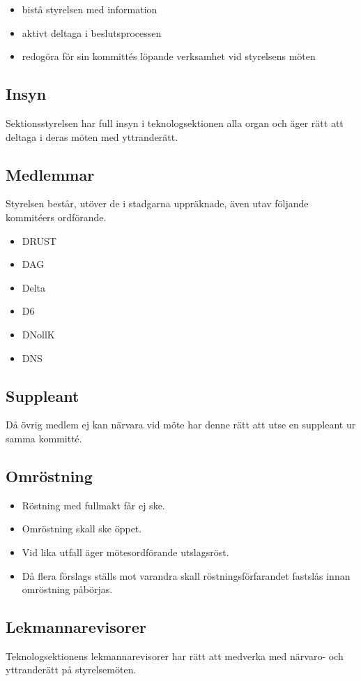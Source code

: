 \begin{itemize}
  \item bistå styrelsen med information 
  \item aktivt deltaga i beslutsprocessen 
  \item redogöra för sin kommittés löpande verksamhet vid styrelsens möten 
\end{itemize}

\subsection{Insyn} 

Sektionsstyrelsen har full insyn i teknologsektionen alla organ och äger rätt att deltaga i deras möten med yttranderätt. 

\subsection{Medlemmar} 
Styrelsen består, utöver de i stadgarna uppräknade, även utav följande kommitéers ordförande. 
\begin{itemize}
  \item DRUST 
  \item DAG 
  \item Delta 
  \item D6 
  \item DNollK
  \item DNS
\end{itemize}

\subsection{Suppleant} 

Då övrig medlem ej kan närvara vid möte har denne rätt att utse en suppleant ur samma kommitté. 
\subsection{Omröstning} 

\begin{itemize}
  \item Röstning med fullmakt får ej ske. 
  \item Omröstning skall ske öppet. 
  \item Vid lika utfall äger mötesordförande utslagsröst. 
  \item Då flera förslags ställs mot varandra skall röstningsförfarandet fastslås innan omröstning påbörjas.
\end{itemize}

\subsection{Lekmannarevisorer}
Teknologsektionens lekmannarevisorer har rätt att medverka med närvaro-
och yttranderätt på styrelsemöten.
\newpage

